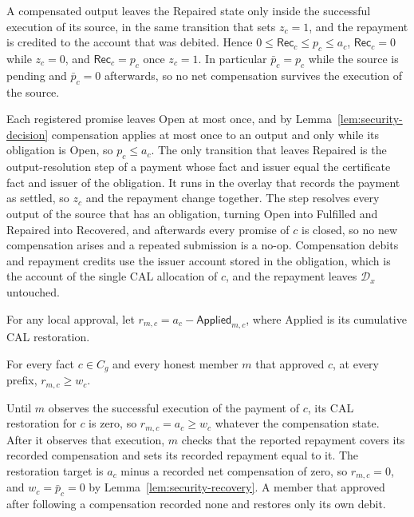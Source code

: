 \begin{lemma}
\label{lem:security-recovery}
A compensated output leaves the Repaired state only inside the successful
execution of its source, in the same transition that sets $z_c=1$, and
the repayment is credited to the account that was debited. Hence
$0\le\mathsf{Rec}_c\le p_c\le a_c$, $\mathsf{Rec}_c=0$ while $z_c=0$,
and $\mathsf{Rec}_c=p_c$ once $z_c=1$. In particular $\bar p_c=p_c$ while
the source is pending and $\bar p_c=0$ afterwards, so no net compensation
survives the execution of the source.
\end{lemma}
\begin{IEEEproof}
Each registered promise leaves Open at most once, and by Lemma~\ref{lem:security-decision} compensation applies at most once to an output and only while its obligation is Open, so $p_c\le a_c$. The only transition that leaves Repaired is the output-resolution step of a payment whose fact and issuer equal the certificate fact and issuer of the obligation. It runs in the overlay that records the payment as settled, so $z_c$ and the repayment change together. The step resolves every output of the source that has an obligation, turning Open into Fulfilled and Repaired into Recovered, and afterwards every promise of $c$ is closed, so no new compensation arises and a repeated submission is a no-op. Compensation debits and repayment credits use the issuer account stored in the obligation, which is the account of the single CAL allocation of $c$, and the repayment leaves $\mathcal D_x$ untouched.
\end{IEEEproof}

For any local approval, let $r_{m,c}=a_c-\mathsf{Applied}_{m,c}$, where Applied is its cumulative CAL restoration.

\begin{lemma}
\label{lem:security-witness}
For every fact $c\in C_g$ and every honest member $m$ that approved $c$,
at every prefix,
$r_{m,c}\ge w_c$.
\end{lemma}
\begin{IEEEproof}
Until $m$ observes the successful execution of the payment of $c$, its CAL restoration for $c$ is zero, so $r_{m,c}=a_c\ge w_c$ whatever the compensation state. After it observes that execution, $m$ checks that the reported repayment covers its recorded compensation and sets its recorded repayment equal to it. The restoration target is $a_c$ minus a recorded net compensation of zero, so $r_{m,c}=0$, and $w_c=\bar p_c=0$ by Lemma~\ref{lem:security-recovery}. A member that approved after following a compensation recorded none and restores only its own debit.
\end{IEEEproof}

